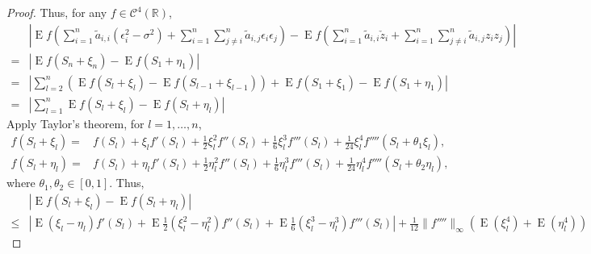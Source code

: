 \documentclass[11pt]{article}
\DeclareMathOperator{\myE}{E}
\theoremstyle{plain}
\theoremstyle{definition}
\theoremstyle{remark}
\begin{document}
\begin{appendices}
\begin{proof}
    Thus, for any $f \in \mathscr C^4 (\mathbb R)$,
    \begin{equation*}
        \begin{split}
        &
        \left|\myE f\left(\sum_{i=1}^n \tilde a_{i,i}(\epsilon_i^2 - \sigma^2)
        +\sum_{i=1}^n \sum_{j\neq i}^n \tilde a_{i,j} \epsilon_i \epsilon_j\right)
        -
        \myE f\left(\sum_{i=1}^n \tilde a_{i,i}\check z_i
        +\sum_{i=1}^n \sum_{j\neq i}^n \tilde a_{i,j} z_i z_j\right)\right| 
        \\
        =&
        \left| \myE f(S_n+\xi_n)-\myE f(S_1+\eta_1)\right|
        \\
        =&
        \left|\sum_{l=2}^{n} \left(\myE f(S_{l}+\xi_{l})-\myE f(S_{l-1}+\xi_{l-1})\right)+\myE f(S_{1}+\xi_{1})-\myE f(S_{1}+\eta_{1})\right|
        \\
        = &
       \left| \sum_{l=1}^{n} \myE f(S_{l}+\xi_{l})-\myE f(S_{l}+\eta_{l})\right|
        \end{split}
    \end{equation*}
    Apply Taylor's theorem, for $l=1,\ldots,n$,
    \begin{equation*}
        \begin{split}
            f(S_{l}+\xi_{l})=&
            f(S_{l})
            +
            \xi_{l}f'(S_{l})
            +
            \frac{1}{2}\xi_{l}^2f''(S_{l})
            +\frac{1}{6}\xi_{l}^3 f''' (S_{l})
            +
            \frac{1}{24}\xi_{l}^4 f'''' (S_{l}+\theta_1 \xi_{l}),
            \\
            f(S_{l}+\eta_{l})=&
            f(S_{l})
            +
            \eta_{l}f'(S_{l})
            +
            \frac{1}{2}\eta_{l}^2f''(S_{l})
            +\frac{1}{6}\eta_{l}^3 f''' (S_{l})
            +
            \frac{1}{24}\eta_{l}^4 f'''' (S_{l}+\theta_2 \eta_{l}),
        \end{split}
    \end{equation*}
    where $\theta_1,\theta_2\in[0,1]$.
    Thus,
    \begin{equation*}
        \begin{split}
             &\left| \myE f(S_{l}+\xi_{l})-\myE f(S_{l}+\eta_{l})\right|
             \\
\leq&
\left|
\myE (\xi_{l}-\eta_{l})f'(S_{l})
            +
            \myE \frac{1}{2}(\xi_{l}^2-\eta_l^2)f''(S_{l})
            +
            \myE \frac{1}{6}(\xi_{l}^3-\eta_l^3) f''' (S_{l})
            \right|
            +
        \frac{1}{12} \|f'''' \|_{\infty} \left( \myE (\xi_{l}^4)+\myE (\eta_{l}^4)\right)

\end{split}
\end{equation*}
\end{proof}
\end{appendices}
\end{document}

